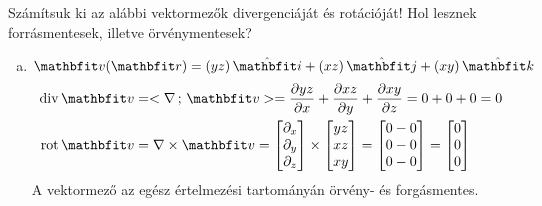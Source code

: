 \documentclass[exercise]{math-standalone}
\begin{document}
\begin{exercise}{%
    Számítsuk ki az alábbi vektormezők divergenciáját és rotációját!
    Hol lesznek forrásmentesek, illetve örvénymentesek?
  }
{\begin{enumerate}[a)]
      \item $\rvec v(\rvec r) = (yz) \,\uvec i + (xz) \,\uvec j + (xy) \,\uvec k$
            \begin{align*}
              \Div \rvec v
               & = \scalar{\nabla}{\rvec v}
              = \pdv{yz}{x} + \pdv{xz}{y} + \pdv{xy}{z}
              = 0 + 0 + 0
              = 0
              \\
              \rot \rvec v
               & = \nabla \times \rvec v
              = \begin{bmatrix}
                  \partial_x \\ \partial_y \\ \partial_z
                \end{bmatrix} \times \begin{bmatrix}
                                       yz \\ xz \\ xy
                                     \end{bmatrix} = \begin{bmatrix}
                                                       0 - 0 \\ 0 - 0 \\ 0 - 0
                                                     \end{bmatrix} = \begin{bmatrix}
                                                                       0 \\ 0 \\ 0
                                                                     \end{bmatrix}
            \end{align*}
            A vektormező az egész értelmezési tartományán örvény- és
            forgásmentes.


\end{enumerate}}
\end{exercise}
\end{document}
